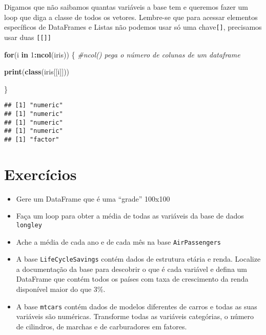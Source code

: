 \documentclass[]{article}
\newenvironment{Shaded}{\begin{snugshade}}{\end{snugshade}}
\newcommand{\CommentTok}[1]{\textcolor[rgb]{0.56,0.35,0.01}{\textit{#1}}}
\newcommand{\ControlFlowTok}[1]{\textcolor[rgb]{0.13,0.29,0.53}{\textbf{#1}}}
\newcommand{\DecValTok}[1]{\textcolor[rgb]{0.00,0.00,0.81}{#1}}
\newcommand{\KeywordTok}[1]{\textcolor[rgb]{0.13,0.29,0.53}{\textbf{#1}}}
\newcommand{\NormalTok}[1]{#1}
\newcommand{\OperatorTok}[1]{\textcolor[rgb]{0.81,0.36,0.00}{\textbf{#1}}}
\providecommand{\tightlist}{%
  \setlength{\itemsep}{0pt}\setlength{\parskip}{0pt}}
\begin{document}
Digamos que não saibamos quantas variáveis a base tem e queremos fazer
um loop que diga a classe de todos os vetores. Lembre-se que para
acessar elementos específicos de DataFrames e Listas não podemos usar só
uma chave\texttt{{[}{]}}, precisamos usar duas \texttt{{[}{[}{]}{]}}

\begin{Shaded}
\begin{Highlighting}[]
\ControlFlowTok{for}\NormalTok{(i }\ControlFlowTok{in} \DecValTok{1}\OperatorTok{:}\KeywordTok{ncol}\NormalTok{(iris)) \{ }\CommentTok{#ncol() pega o número de colunas de um dataframe}
  
  \KeywordTok{print}\NormalTok{(}\KeywordTok{class}\NormalTok{(iris[[i]]))}
  
\NormalTok{\}}
\end{Highlighting}
\end{Shaded}

\begin{verbatim}
## [1] "numeric"
## [1] "numeric"
## [1] "numeric"
## [1] "numeric"
## [1] "factor"
\end{verbatim}

\hypertarget{exercicios-1}{%
\section{Exercícios}\label{exercicios-1}}

\begin{itemize}
\tightlist
\item
  Gere um DataFrame que é uma ``grade'' 100x100
\item
  Faça um loop para obter a média de todas as variáveis da base de dados
  \texttt{longley}
\item
  Ache a média de cada ano e de cada mês na base \texttt{AirPassengers}
\item
  A base \texttt{LifeCycleSavings} contém dados de estrutura etária e
  renda. Localize a documentação da base para descobrir o que é cada
  variável e defina um DataFrame que contém todos os países com taxa de
  crescimento da renda disponível maior do que 3\%.
\item
  A base \texttt{mtcars} contém dados de modelos diferentes de carros e
  todas as suas variáveis são numéricas. Transforme todas as variáveis
  categórias, o número de cilindros, de marchas e de carburadores em
  fatores.
\end{itemize}
\end{document}
